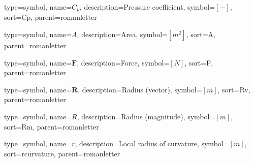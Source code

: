 {
	type=symbol, %
	name={\ensuremath{C_p}}, %
	description={Pressure coefficient}, %
	symbol={$\left[-\right]$}, %
	sort=Cp, %
	parent=romanletter %
}

{
type=symbol, %
name={\ensuremath{A}}, %
description={Area}, %
symbol={$\left[m^2\right]$}, %
sort=A, %
parent=romanletter %
}

{
type=symbol, %
name={\ensuremath{\mathbf{F}}}, %
description={Force}, %
symbol={$\left[N\right]$}, %
sort=F, %
parent=romanletter %
}

{
type=symbol, %
name={\ensuremath{\mathbf{R}}}, %
description={Radius (vector)}, %
symbol={$\left[m\right]$}, %
sort=Rv, %
parent=romanletter %
}

{
type=symbol, %
name={\ensuremath{R}}, %
description={Radius (magnitude)}, %
symbol={$\left[m\right]$}, %
sort=Rm, %
parent=romanletter %
}

{
	type=symbol, %
	name={\ensuremath{r}}, %
	description={Local radius of curvature}, %
	symbol={$\left[m\right]$}, %
	sort=rcurvature, %
	parent=romanletter %
}

